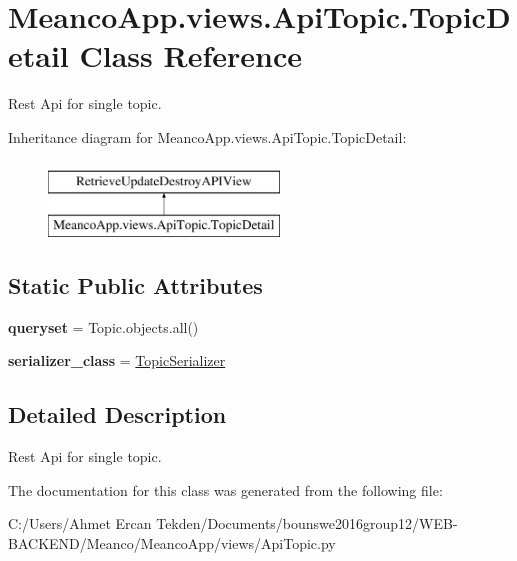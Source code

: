 \hypertarget{class_meanco_app_1_1views_1_1_api_topic_1_1_topic_detail}{}\section{Meanco\+App.\+views.\+Api\+Topic.\+Topic\+Detail Class Reference}
\label{class_meanco_app_1_1views_1_1_api_topic_1_1_topic_detail}


Rest Api for single topic.  


Inheritance diagram for Meanco\+App.\+views.\+Api\+Topic.\+Topic\+Detail\+:\begin{figure}[H]
\begin{center}
\leavevmode
\includegraphics[height=2.000000cm]{class_meanco_app_1_1views_1_1_api_topic_1_1_topic_detail}
\end{center}
\end{figure}
\subsection*{Static Public Attributes}
\begin{DoxyCompactItemize}
\item 
\hypertarget{class_meanco_app_1_1views_1_1_api_topic_1_1_topic_detail_a5db5e2397093333845f0877124cb9f8a}{}\label{class_meanco_app_1_1views_1_1_api_topic_1_1_topic_detail_a5db5e2397093333845f0877124cb9f8a} 
{\bfseries queryset} = Topic.\+objects.\+all()
\item 
\hypertarget{class_meanco_app_1_1views_1_1_api_topic_1_1_topic_detail_aebe26738ec44f5e93c9a0e22b5eeb815}{}\label{class_meanco_app_1_1views_1_1_api_topic_1_1_topic_detail_aebe26738ec44f5e93c9a0e22b5eeb815} 
{\bfseries serializer\+\_\+class} = \hyperlink{class_meanco_app_1_1serializers_1_1_topic_serializer}{Topic\+Serializer}
\end{DoxyCompactItemize}


\subsection{Detailed Description}
Rest Api for single topic. 

The documentation for this class was generated from the following file\+:\begin{DoxyCompactItemize}
\item 
C\+:/\+Users/\+Ahmet Ercan Tekden/\+Documents/bounswe2016group12/\+W\+E\+B-\/\+B\+A\+C\+K\+E\+N\+D/\+Meanco/\+Meanco\+App/views/Api\+Topic.\+py\end{DoxyCompactItemize}
